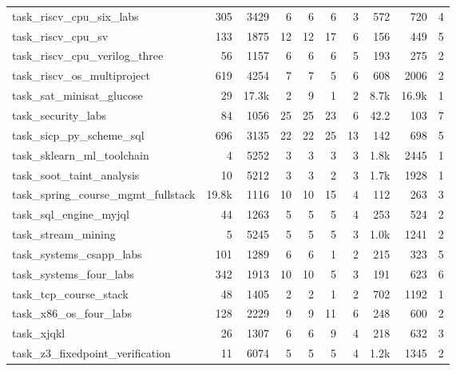 \begin{table}[!htbp]
{\begin{tabular}{@{}lrr|r|rrr|rrr@{}}
task\_riscv\_cpu\_six\_labs & 305 & 3429 & 6 & 6 & 6 & 3 & 572 & 720 & 4 \\
task\_riscv\_cpu\_sv & 133 & 1875 & 12 & 12 & 17 & 6 & 156 & 449 & 5 \\
task\_riscv\_cpu\_verilog\_three & 56 & 1157 & 6 & 6 & 6 & 5 & 193 & 275 & 2 \\
task\_riscv\_os\_multiproject & 619 & 4254 & 7 & 7 & 5 & 6 & 608 & 2006 & 2 \\
task\_sat\_minisat\_glucose & 29 & 17.3k & 2 & 9 & 1 & 2 & 8.7k & 16.9k & 1 \\
task\_security\_labs & 84 & 1056 & 25 & 25 & 23 & 6 & 42.2 & 103 & 7 \\
task\_sicp\_py\_scheme\_sql & 696 & 3135 & 22 & 22 & 25 & 13 & 142 & 698 & 5 \\
task\_sklearn\_ml\_toolchain & 4 & 5252 & 3 & 3 & 3 & 3 & 1.8k & 2445 & 1 \\
task\_soot\_taint\_analysis & 10 & 5212 & 3 & 3 & 2 & 3 & 1.7k & 1928 & 1 \\
task\_spring\_course\_mgmt\_fullstack & 19.8k & 1116 & 10 & 10 & 15 & 4 & 112 & 263 & 3 \\
task\_sql\_engine\_myjql & 44 & 1263 & 5 & 5 & 5 & 4 & 253 & 524 & 2 \\
task\_stream\_mining & 5 & 5245 & 5 & 5 & 5 & 3 & 1.0k & 1241 & 2 \\
task\_systems\_csapp\_labs & 101 & 1289 & 6 & 6 & 1 & 2 & 215 & 323 & 5 \\
task\_systems\_four\_labs & 342 & 1913 & 10 & 10 & 5 & 3 & 191 & 623 & 6 \\
task\_tcp\_course\_stack & 48 & 1405 & 2 & 2 & 1 & 2 & 702 & 1192 & 1 \\
task\_x86\_os\_four\_labs & 128 & 2229 & 9 & 9 & 11 & 6 & 248 & 600 & 2 \\
task\_xjqkl & 26 & 1307 & 6 & 6 & 9 & 4 & 218 & 632 & 3 \\
task\_z3\_fixedpoint\_verification & 11 & 6074 & 5 & 5 & 5 & 4 & 1.2k & 1345 & 2 \\
\bottomrule
\end{tabular}
}
\end{table}
